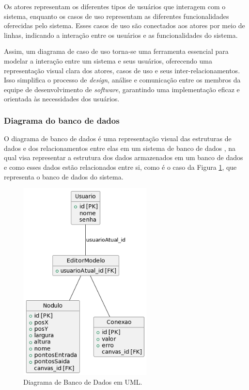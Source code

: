 Os atores representam os diferentes tipos de usuários que interagem com o sistema, enquanto os casos de uso representam as diferentes funcionalidades oferecidas pelo sistema. Esses casos de uso são conectados aos atores por meio de linhas, indicando a interação entre os usuários e as funcionalidades do sistema.
        
Assim, um diagrama de caso de uso torna-se uma ferramenta essencial para modelar a interação entre um sistema e seus usuários, oferecendo uma representação visual clara dos atores, casos de uso e seus inter-relacionamentos. Isso simplifica o processo de \textit{design}, análise e comunicação entre os membros da equipe de desenvolvimento de \textit{software}, garantindo uma implementação eficaz e orientada às necessidades dos usuários.
        
\subsubsection{Diagrama do banco de dados}

O diagrama de banco de dados é uma representação visual das estruturas de dados e dos relacionamentos entre elas em um sistema de banco de dados \cite{databasedepth}, na qual visa representar a estrutura dos dados armazenados em um banco de dados e como esses dados estão relacionados entre si, como é o caso da Figura \ref{fig:DatabaseDiagram}, que representa o banco de dados do sistema.
            
\begin{figure}[htb]
    \caption{\label{fig:DatabaseDiagram}Diagrama de Banco de Dados em UML.}
    \begin{center}
        \includegraphics[width=0.6\textwidth]{figuras/DatabaseDiagram.png}
    \end{center}
\end{figure}
            

